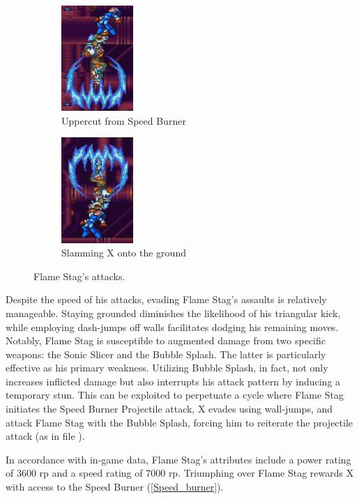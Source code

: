 \begin{figure}[htp]
	\begin{subfigure}{0.4\linewidth}
		\centering
		\includegraphics[height=4cm]{figures/X2/Flame_stag/Stag_uppercut.png}
		\caption{Uppercut from Speed Burner}
	\end{subfigure}
	\begin{subfigure}{0.4\linewidth}
		\centering
		\includegraphics[height=4cm]{figures/X2/Flame_stag/Stag_descend.png}
		\caption{Slamming X onto the ground}
	\end{subfigure}
	\caption{Flame Stag's attacks.}
\end{figure}
Despite the speed of his attacks, evading Flame Stag's assaults is relatively manageable. Staying grounded diminishes the likelihood of his triangular kick, while employing dash-jumps off walls facilitates dodging his remaining moves. Notably, Flame Stag is susceptible to augmented damage from two specific weapons: the Sonic Slicer and the Bubble Splash. The latter is particularly effective as his primary weakness. Utilizing Bubble Splash, in fact, not only increases inflicted damage but also interrupts his attack pattern by inducing a temporary stun. This can be exploited to perpetuate a cycle where Flame Stag initiates the Speed Burner Projectile attack, X evades using wall-jumps, and attack Flame Stag with the Bubble Splash, forcing him to reiterate the projectile attack (as in file ).

In accordance with in-game data, Flame Stag's attributes include a power rating of 3600 rp and a speed rating of 7000 rp. Triumphing over Flame Stag rewards X with access to the Speed Burner (\ref{Speed_burner}).

